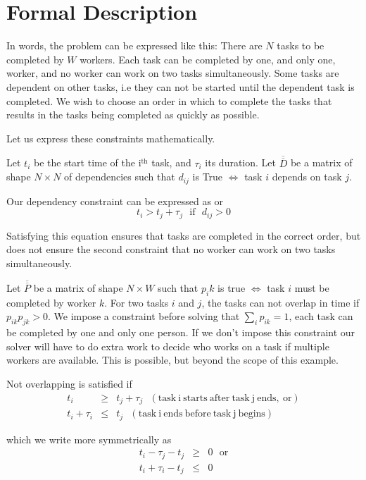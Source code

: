 \documentclass[12pt]{article}
\newcommand{\mat}[1]{\ensuremath{\overline{\overline{#1}}}}
\begin{document}
\section*{Formal Description}
In words, the problem can be expressed like this:
There are $N$ tasks to be completed by $W$ workers. Each task can be completed by one, and only one, worker, and no worker can work on two tasks simultaneously. Some tasks are dependent on other tasks, i.e they can not be started until the dependent task is completed. We wish to choose an order in which to complete the tasks that results in the tasks being completed as quickly as possible.

Let us express these constraints mathematically.

Let $t_i$ be the start time of the i$^{\mathrm{th}}$ task, and $\tau_i$ its duration.
Let \mat{D} be a matrix of shape $N \times N$ of dependencies such that $d_{ij}$ is True $\Leftrightarrow$ task $i$ depends on task $j$.

Our dependency constraint can be expressed as
or
\begin{equation}
t_i > t_j + \tau_j ~~~\mathrm{if}~~~ d_{ij} > 0
\end{equation}

Satisfying this equation ensures that tasks are completed in the correct order, but does not ensure the second constraint that no worker can work on two tasks simultaneously.

Let \mat{P} be a matrix of shape $N \times W$ such that $p_ik$ is true $\Leftrightarrow$ task $i$ must be completed by worker $k$. For two tasks $i$ and $j$, the tasks can not overlap in time if $p_{ik}p_{jk} > 0$. We impose a constraint before solving that $\sum_{i} p_{ik} = 1$, each task can be completed by one and only one person. If we don't impose this constraint our solver will have to do extra work to decide who works on a task if multiple workers are available. This is possible, but beyond the scope of this example.


Not overlapping is satisfied if
\begin{eqnarray}
t_i &\ge& t_j + \tau_j  \mathrm{~~~ (task~i~starts~after~task~j~ends,~or)}\\
t_i + \tau_i &\le& t_j  \mathrm{~~~ (task~i~ends~before~task~j~begins)}
\end{eqnarray}

which we write more symmetrically as
\begin{eqnarray}
\label{people}
t_i - \tau_j  - t_j &\ge& 0  \mathrm{~~~or}\\
t_i + \tau_i  - t_j &\le& 0
\end{eqnarray}
\end{document}
